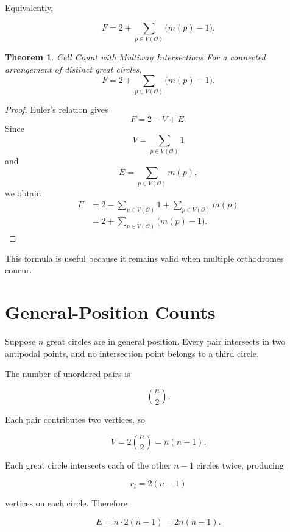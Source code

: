 \documentclass[11pt,fleqn]{book}
\numberwithin{equation}{chapter}
\theoremstyle{plain}
\newtheorem{theorem}{Theorem}[chapter]
\theoremstyle{definition}
\theoremstyle{remark}
\newcommand{\Oset}{\mathcal{O}}
\begin{document}
Equivalently,

\begin{equation}
    F
    =
    2
    +
    \sum_{p\in V(\Oset)}
    \bigl(m(p)-1\bigr).
\end{equation}

\begin{theorem}{Cell Count with Multiway Intersections}
For a connected arrangement of distinct great circles,
\[
F
=
2
+
\sum_{p\in V(\Oset)}
\bigl(m(p)-1\bigr).
\]
\end{theorem}

\begin{proof}
Euler's relation gives
\[
F=2-V+E.
\]
Since
\[
V=\sum_{p\in V(\Oset)}1
\]
and
\[
E=\sum_{p\in V(\Oset)}m(p),
\]
we obtain
\begin{align}
F
&=
2
-
\sum_{p\in V(\Oset)}1
+
\sum_{p\in V(\Oset)}m(p)
\\
&=
2
+
\sum_{p\in V(\Oset)}
\bigl(m(p)-1\bigr).
\end{align}
\end{proof}

This formula is useful because it remains valid when multiple orthodromes concur.

\section{General-Position Counts}
\label{sec:general-position-counts}

Suppose \(n\) great circles are in general position. Every pair intersects in two antipodal points, and no intersection point belongs to a third circle.

The number of unordered pairs is

\begin{equation}
    \binom{n}{2}.
\end{equation}

Each pair contributes two vertices, so

\begin{equation}
    V
    =
    2\binom{n}{2}
    =
    n(n-1).
\end{equation}

Each great circle intersects each of the other \(n-1\) circles twice, producing

\begin{equation}
    r_i=2(n-1)
\end{equation}

vertices on each circle. Therefore

\begin{equation}
    E
    =
    n\cdot 2(n-1)
    =
    2n(n-1).
\end{equation}
\end{document}
